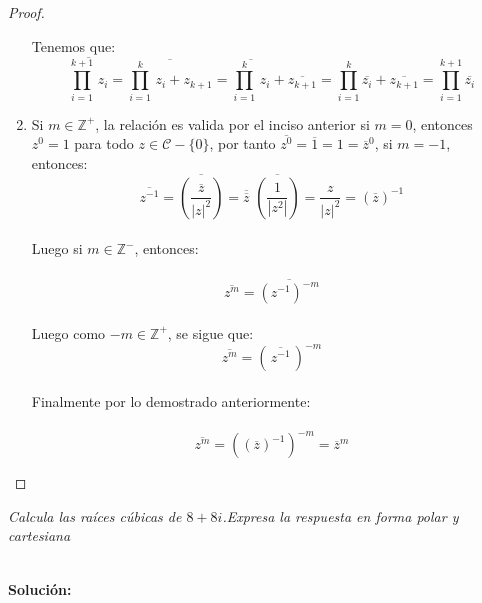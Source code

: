 \documentclass[11pt,letterpaper]{article}
\newcommand{\C}{\mathcal{C}}
\newcommand{\Z}{\mathbb{Z}}
\begin{document}
\begin{proof}
\begin{enumerate}
        Tenemos que:\,\\
        \begin{equation*}
            \overline{\prod_{i=1}^{k+1}\,z_i}=\overline{\prod_{i=1}^{k}\,z_i+z_{k+1}}=\overline{\prod_{i=1}^{k}\,z_i}+\overline{z_{k+1}}=\prod_{i=1}^k\overline{z_i}+\overline{z_{k+1}}=\prod_{i=1}^{k+1}\overline{z_i}
        \end{equation*}
        \item Si $m\in \Z^{+}$, la relaci\'on es valida por el inciso anterior si $m=0$, entonces
        $z^0=1$ para todo $z\in \C-\{0\}$, por tanto $\overline{z^0}=\overline{1}=1=\overline{z}^0$, si $m=-1$, entonces:\,\\
        \begin{equation*}
            \overline{z^{-1}}=\overline{\left(\frac{\overline{z}}{|z|^2}\right)}=\overline{\overline{z}}\,\,\overline{\left(\frac{1}{|z^2|}\right)}=\frac{z}{|z|^2}=(\overline{z})^{-1}
        \end{equation*}\,\\
        Luego si $m\in \Z^{-}$, entonces:\,\\
        \,\\
        \begin{equation*}
            \overline{z^{m}}=\overline{(z^{-1})^{-m}}
        \end{equation*}\,\\
        Luego como $-m\in \Z^{+}$, se sigue que:\,\\
        \begin{equation*}
            \overline{z^{m}}=\left(\,\overline{z^{-1}}\,\right)^{-m}
        \end{equation*}\,\\
        Finalmente por lo demostrado anteriormente:\,\\
        \,\\
        \begin{equation*}
            \overline{z^{m}}=((\overline{z})^{-1})^{-m}=\overline{z}^m
        \end{equation*}
    \end{enumerate}
\end{proof}
\newpage
\begin{tcolorbox}[
	title = \textcolor{black}{\textcolor{white}{Problema 3}},]
\textit{Calcula las ra\'ices c\'ubicas de $8+8i$.Expresa la respuesta en
forma polar y cartesiana
}
\end{tcolorbox}
\,\\
\textbf{Soluci\'on:}
    \,\\
\end{document}
